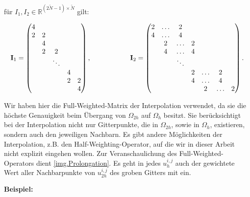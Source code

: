 für $I_{1},I_{2} \in \mathbb{R}^{(2\tilde N - 1) \times \tilde N}$ gilt:

\begin{equation}
{\textbf{I}}_{1} =
\begin{pmatrix}
4 & & & &\\
2 & 2 & & &\\
& 4 & & &\\
& 2 & 2 & &\\
& & \ddots & &\\
& & & 4 &\\
& & & 2 & 2\\
& & & & 4\\
\end{pmatrix},
\hspace{2cm}
{\textbf{I}}_{2} =
\begin{pmatrix}
2 & \hdots & 2 & & & &\\
4 & \hdots & 4 & & & &\\
& 2 & \hdots & 2 & & &\\
& 4 & \hdots & 4 & & &\\
& & \ddots & & & &\\
& & & 2 & \hdots & 2 &\\
& & & 4 & \hdots & 4 &\\
& & & & 2 & \hdots & 2\\
\end{pmatrix}.
\end{equation}

Wir haben hier die Full-Weighted-Matrix der Interpolation verwendet, da sie die höchste Genauigkeit beim Übergang von $\Omega_{2h}$ auf $\Omega_{h}$ besitzt. Sie berücksichtigt bei der Interpolation nicht nur Gitterpunkte, die in $\Omega_{2h}$, sowie in $\Omega_{h}$, existieren, sondern auch den jeweiligen Nachbarn. Es gibt andere Möglichkeiten der Interpolation, z.B. den Half-Weighting-Operator, auf die wir in dieser Arbeit nicht explizit eingehen wollen. Zur Veranschaulichung des Full-Weighted-Operators dient \autoref{img.Prolongation}. Es geht in jedes $u^{i,j}_{h}$ auch der gewichtete Wert aller Nachbarpunkte von $u^{i,j}_{2h}$ des groben Gitters mit ein.

\textbf{Beispiel:}

